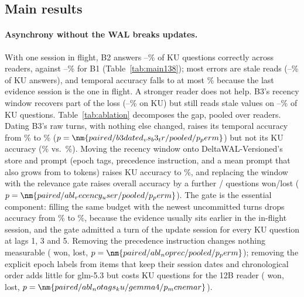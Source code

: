 \subsection{Main results}
\label{sec:main}



\paragraph{Asynchrony without the WAL breaks updates.}
With one session in flight, B2 answers --\% of KU questions correctly across readers, against --\% for B1 (Table~\ref{tab:main138}); most errors are stale reads (--\% of KU answers), and temporal accuracy falls to at most \% because the last evidence session is the one in flight. A stronger reader does not help. B3's recency window recovers part of the loss (--\% on KU) but still reads stale values on --\% of KU questions. Table~\ref{tab:ablation} decomposes the gap, pooled over readers. Dating B3's raw turns, with nothing else changed, raises its temporal accuracy from \% to \% ($p=\nm{paired/b3dated_vs_b3_tr/pooled/p_perm}$) but not its KU accuracy (\% vs.\ \%). Moving the recency window onto DeltaWAL-Versioned's store and prompt (epoch tags, precedence instruction, and a mean prompt that also grows from  to  tokens) raises KU accuracy to \%, and replacing the window with the relevance gate raises overall accuracy by a further / questions won/lost ($p=\nm{paired/abl_recency_user/pooled/p_perm}$). The gate is the essential component: filling the same budget with the newest uncommitted turns drops accuracy from \% to \%, because the evidence usually sits earlier in the in-flight session, and the gate admitted a turn of the update session for every KU question at lags 1, 3 and 5. Removing the precedence instruction changes nothing measurable ( won,  lost, $p=\nm{paired/abl_noprec/pooled/p_perm}$); removing the explicit epoch labels from items that keep their session dates and chronological order adds little for glm-5.3 but costs KU questions for the 12B reader ( won,  lost, $p=\nm{paired/abl_notags_ku/gemma4/p_mcnemar}$).

